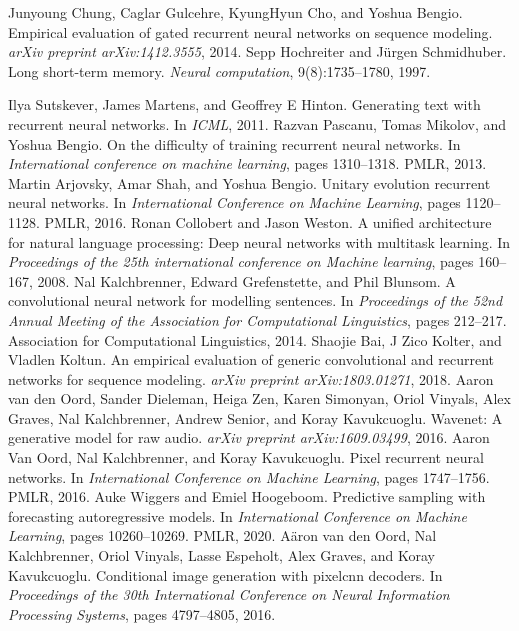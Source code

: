 \begin{chapterreferences}
 Junyoung Chung, Caglar Gulcehre, KyungHyun Cho, and Yoshua Bengio. Empirical evaluation of gated recurrent neural networks on sequence modeling. \emph{arXiv preprint arXiv:1412.3555}, 2014.
 Sepp Hochreiter and Jürgen Schmidhuber. Long short-term memory. \emph{Neural computation}, 9(8):1735--1780, 1997.

 Ilya Sutskever, James Martens, and Geoffrey E Hinton. Generating text with recurrent neural networks. In \emph{ICML}, 2011.
 Razvan Pascanu, Tomas Mikolov, and Yoshua Bengio. On the difficulty of training recurrent neural networks. In \emph{International conference on machine learning}, pages 1310--1318. PMLR, 2013.
 Martin Arjovsky, Amar Shah, and Yoshua Bengio. Unitary evolution recurrent neural networks. In \emph{International Conference on Machine Learning}, pages 1120--1128. PMLR, 2016.
 Ronan Collobert and Jason Weston. A unified architecture for natural language processing: Deep neural networks with multitask learning. In \emph{Proceedings of the 25th international conference on Machine learning}, pages 160--167, 2008.
 Nal Kalchbrenner, Edward Grefenstette, and Phil Blunsom. A convolutional neural network for modelling sentences. In \emph{Proceedings of the 52nd Annual Meeting of the Association for Computational Linguistics}, pages 212--217. Association for Computational Linguistics, 2014.
 Shaojie Bai, J Zico Kolter, and Vladlen Koltun. An empirical evaluation of generic convolutional and recurrent networks for sequence modeling. \emph{arXiv preprint arXiv:1803.01271}, 2018.
 Aaron van den Oord, Sander Dieleman, Heiga Zen, Karen Simonyan, Oriol Vinyals, Alex Graves, Nal Kalchbrenner, Andrew Senior, and Koray Kavukcuoglu. Wavenet: A generative model for raw audio. \emph{arXiv preprint arXiv:1609.03499}, 2016.
 Aaron Van Oord, Nal Kalchbrenner, and Koray Kavukcuoglu. Pixel recurrent neural networks. In \emph{International Conference on Machine Learning}, pages 1747--1756. PMLR, 2016.
 Auke Wiggers and Emiel Hoogeboom. Predictive sampling with forecasting autoregressive models. In \emph{International Conference on Machine Learning}, pages 10260--10269. PMLR, 2020.
 Aäron van den Oord, Nal Kalchbrenner, Oriol Vinyals, Lasse Espeholt, Alex Graves, and Koray Kavukcuoglu. Conditional image generation with pixelcnn decoders. In \emph{Proceedings of the 30th International Conference on Neural Information Processing Systems}, pages 4797--4805, 2016.

\end{chapterreferences}
